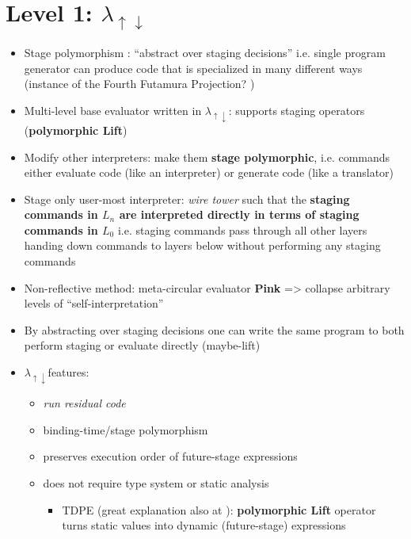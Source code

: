 \documentclass[fleqn]{article}
\theoremstyle{definition}
\newcommand{\mslang}{$\lambda_{\uparrow\downarrow}$}
\begin{document}
\section{Level 1: \mslang}\label{sec:mslang}
\begin{itemize}
	\item Stage polymorphism \cite{ofenbeck2017staging}: ``abstract over staging decisions'' i.e. single program generator can produce code that is specialized in many different ways (instance of the Fourth Futamura Projection? \cite{gluck2009there}) 
	\item Multi-level base evaluator written in \mslang: supports staging operators (\textbf{polymorphic Lift})
	\item Modify other interpreters: make them \textbf{stage polymorphic}, i.e. commands either evaluate code (like an interpreter) or generate code (like a translator)
	\item Stage only user-most interpreter: \textit{wire tower} such that the \textbf{staging commands in $L_{n}$ are interpreted directly in terms of staging commands in $L_{0}$} i.e. staging commands pass through all other layers handing down commands to layers below without performing any staging commands
	\item Non-reflective method: meta-circular evaluator \textbf{Pink} => collapse arbitrary levels of ``self-interpretation''
	\item By abstracting over staging decisions one can write the same program to both perform staging or evaluate directly \cite{amin2017collapsing} (maybe-lift)
	\item \mslang features:
	\begin{itemize}
		\item \textit{run residual code}
		\item binding-time/stage polymorphism \cite{henglein1994polymorphic}
		\item preserves execution order of future-stage expressions
		\item does not require type system or static analysis
		\begin{itemize}
			\item TDPE \cite{danvy1999type} (great explanation also at \cite{grobauer2001second}): \textbf{polymorphic Lift} operator turns static values into dynamic (future-stage) expressions
		\end{itemize}
	\end{itemize}
\end{itemize}
\end{document}
